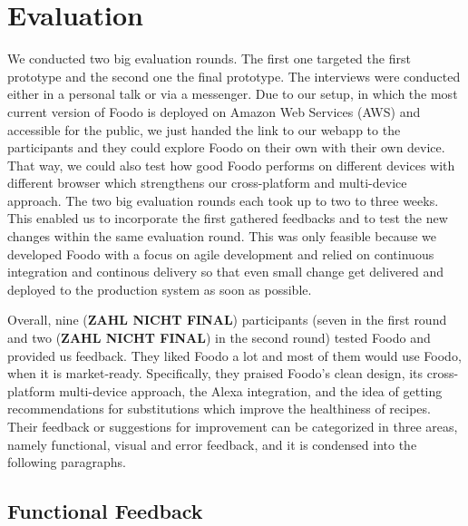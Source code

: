 \chapter{Evaluation}
We conducted two big evaluation rounds. The first one targeted the first prototype and the second one the final prototype. The interviews were conducted either in a personal talk or via a messenger. Due to our setup, in which the most current version of Foodo is deployed on Amazon Web Services (AWS) and accessible for the public, we just handed the link to our webapp to the participants and they could explore Foodo on their own with their own device. That way, we could also test how good Foodo performs on different devices with different browser which strengthens our cross-platform and multi-device approach. The two big evaluation rounds each took up to two to three weeks. This enabled us to incorporate the first gathered feedbacks and to test the new changes within the same evaluation round. This was only feasible because we developed Foodo with a focus on agile development and relied on continuous integration and continous delivery so that even small change get delivered and deployed to the production system as soon as possible. 

Overall, nine (\textbf{ZAHL NICHT FINAL}) participants (seven in the first round and two (\textbf{ZAHL NICHT FINAL}) in the second round) tested Foodo and provided us feedback. They liked Foodo a lot and most of them would use Foodo, when it is market-ready. Specifically, they praised Foodo's clean design, its cross-platform multi-device approach, the Alexa integration, and the idea of getting recommendations for substitutions which improve the healthiness of recipes. Their feedback or suggestions for improvement can be categorized in three areas, namely functional, visual and error feedback, and it is condensed into the following paragraphs.

\section{Functional Feedback}


